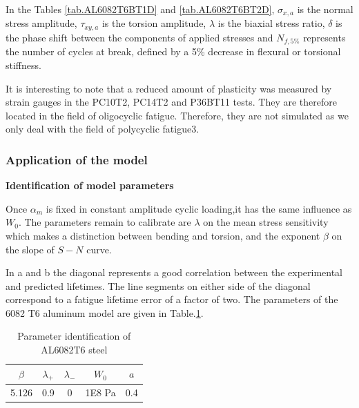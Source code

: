 In the Tables \ref{tab.AL6082T6BT1D} and \ref{tab.AL6082T6BT2D}, $\sigma_{x,a}$ is the normal stress amplitude, $\tau_{xy,a}$ is the torsion amplitude, $\lambda$ is the biaxial stress ratio, $\delta$ is the phase shift between the components of applied stresses and $N_{f,5\%}$ represents the number of cycles at break, defined by a 5\% decrease in flexural or torsional stiffness.

It is interesting to note that a reduced amount of plasticity was measured by strain gauges in the PC10T2, PC14T2 and P36BT11 tests\cite{susmel2003multiaxial}. They are therefore located in the field of oligocyclic fatigue. Therefore, they are not simulated as we only deal with the field of polycyclic fatigue3.

\subsubsection{Application of the model}

\textbf{Identification of model parameters}
\vspace{6pt}

Once $\alpha_m$ is fixed in constant amplitude cyclic loading,it has the same influence as $W_0$. The parameters remain to calibrate are $\lambda$ on the mean stress sensitivity which makes a distinction between bending and torsion, and the exponent $\beta$ on the slope of $S-N$ curve. 

In a and b the diagonal represents a good correlation between the experimental and predicted lifetimes. The line segments on either side of the diagonal correspond to a fatigue lifetime error of a factor of two. The parameters of the 6082 T6 aluminum model are given in Table.\ref{tab.6082T6para}.

\begin{table}[]
\centering
\begin{tabular}{|c|c|c|c|c|}
	\hline
	\textbf{$\beta$} & \textbf{$\lambda_+$} & \textbf{$\lambda_-$} & \textbf{$W_0$} & \textbf{$a$}  \\ \hline
	5.126     & 0.9 &0         &1E8 Pa  & 0.4    \\ \hline
\end{tabular}
\caption{Parameter identification of AL6082T6 steel}
\label{tab.6082T6para}
\end{table}


